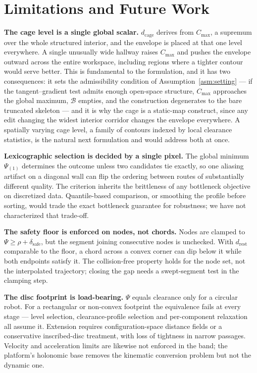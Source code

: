 \documentclass[conference]{IEEEtran}
\begin{document}
\section{Limitations and Future Work}
\label{sec:limitations}

\textbf{The cage level is a single global scalar.} $d_{\mathrm{cage}}$ derives from $C_{\max}$, a supremum over the whole structured interior, and the envelope is placed at that one level everywhere. A single unusually wide hallway raises $C_{\max}$ and pushes the envelope outward across the entire workspace, including regions where a tighter contour would serve better. This is fundamental to the formulation, and it has two consequences: it sets the admissibility condition of Assumption~\ref{asm:setting} --- if the tangent--gradient test admits enough open-space structure, $C_{\max}$ approaches the global maximum, $\mathcal{B}$ empties, and the construction degenerates to the bare truncated skeleton --- and it is why the cage is a static-map construct, since any edit changing the widest interior corridor changes the envelope everywhere. A spatially varying cage level, a family of contours indexed by local clearance statistics, is the natural next formulation and would address both at once.

\textbf{Lexicographic selection is decided by a single pixel.} The global minimum $\Psi_{(1)}$ determines the outcome unless two candidates tie exactly, so one aliasing artifact on a diagonal wall can flip the ordering between routes of substantially different quality. The criterion inherits the brittleness of any bottleneck objective on discretized data. Quantile-based comparison, or smoothing the profile before sorting, would trade the exact bottleneck guarantee for robustness; we have not characterized that trade-off.

\textbf{The safety floor is enforced on nodes, not chords.} Nodes are clamped to $\Psi\ge\rho+\delta_{\mathrm{safe}}$, but the segment joining consecutive nodes is unchecked. With $d_{\mathrm{rest}}$ comparable to the floor, a chord across a convex corner can dip below it while both endpoints satisfy it. The collision-free property holds for the node set, not the interpolated trajectory; closing the gap needs a swept-segment test in the clamping step.

\textbf{The disc footprint is load-bearing.} $\Psi$ equals clearance only for a circular robot. For a rectangular or non-convex footprint the equivalence fails at every stage --- level selection, clearance-profile selection and per-component relaxation all assume it. Extension requires configuration-space distance fields or a conservative inscribed-disc treatment, with loss of tightness in narrow passages. Velocity and acceleration limits are likewise not enforced in the band; the platform's holonomic base removes the kinematic conversion problem but not the dynamic one.
\end{document}
